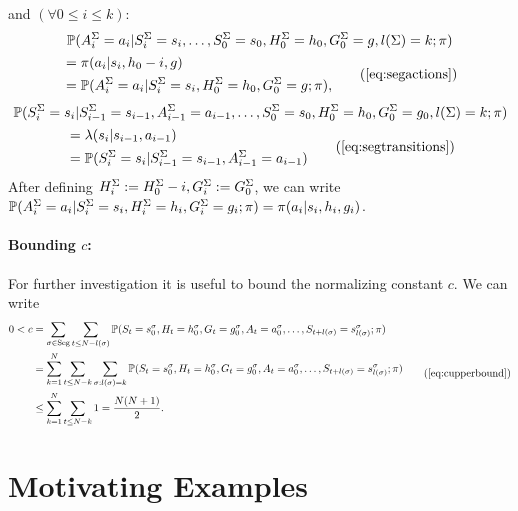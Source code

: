 and
$(\forall 0 \leq i \leq k)$:
\begin{multline}
\prob(\stag{A}_i=a_i|\stag{S}_i=s_i,\ldots,\stag{S}_0=s_0,\stag{H}_0=h_0,\stag{G}_0=g,l(\Sigma)=k;\pi)
\nonumber
\\
\begin{aligned}
&=\pi(a_i|s_i,h_0-i,g)
\\
&=\prob(\stag{A}_i=a_i|\stag{S}_i=s_i,\stag{H}_0=h_0,\stag{G}_0=g;\pi), 
\end{aligned}
\tag{\ref{eq:segactions}}
\end{multline}
\begin{multline}
\prob(\stag{S}_i=s_i|\stag{S}_{i-1}=s_{i-1},\stag{A}_{i-1}=a_{i-1},\ldots,\stag{S}_0=s_0,\stag{H}_0=h_0,\stag{G}_0=g_0,l(\Sigma)=k;\pi)
\\
\begin{aligned}
&=
\tkernel(s_i|s_{i-1},a_{i-1})
\\
&=
\prob(\stag{S}_i=s_i|\stag{S}_{i-1}=s_{i-1},\stag{A}_{i-1}=a_{i-1})
\end{aligned}
\tag{\ref{eq:segtransitions}}
\end{multline}
After defining $H^{\Sigma}_i := H^{\Sigma}_0-i,G^{\Sigma}_i := G^{\Sigma}_0$, we can write
$\mathbb{P}(A^{\Sigma}_i=a_i|S^{\Sigma}_i=s_i,H^{\Sigma}_i=h_i,G^{\Sigma}_i=g_i;\pi)= \pi(a_i|s_i,h_i,g_i)
$.

\paragraph{Bounding $c$:}
For further investigation it is useful to bound the normalizing constant
$c$. We can write
\begin{equation*}
\begin{aligned}
0 < c &= \sum_{\sigma \in \Seg}
\sum_{t \leq N -l(\sigma)}
\prob(S_t=s_0^{\sigma},H_t=h_0^{\sigma},G_t=g_0^{\sigma},A_t=a_0^{\sigma}, \ldots, S_{t+l(\sigma)}=s_{l(\sigma)}^{\sigma} ;\pi)
\\
&=
\sum_{k=1}^{N}
\sum_{t \leq N - k}
\sum_{\sigma : l(\sigma)=k}
\prob(S_t=s_0^{\sigma},H_t=h_0^{\sigma},G_t=g_0^{\sigma},A_t=a_0^{\sigma}, \ldots, S_{t+l(\sigma)}=s_{l(\sigma)}^{\sigma} ;\pi)
\\
&\leq
\sum_{k=1}^{N}
\sum_{t \leq N - k}
1
=
\frac{N(N+1)}{2}
.
\end{aligned}
\tag{\ref{eq:cupperbound}}
\end{equation*}



\section{Motivating Examples}
\label{ap:examples}

